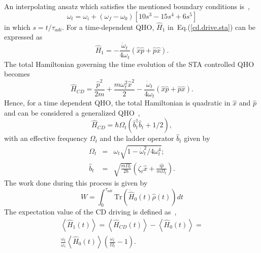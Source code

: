 \documentclass[aps,pra,twocolumn,showpacs,showkeys,groupedaddress,nobalancelastpage,nofootinbib,floatfix,superscriptaddress,longbibliography]{revtex4-2}
\begin{document}
An interpolating ansatz which satisfies the mentioned boundary conditions is~\cite{PhysRevX.4.021013},
\begin{equation}\label{freq.ansazt.sta}
   \omega_t = \omega_i + (\omega_f - \omega_0)[10s^3-15s^4+6s^5]
\end{equation}
in which $s=t/\tau_{adi}$. For a time-dependent QHO, $\hat{H}_1$ in~Eq.(\ref{cd.drive.sta}) can be expressed as~\cite{Muga_2010}
\begin{equation}\label{qho.h1.sta}
\hat{H}_1 = -\frac{\dot{\omega}_t}{4\omega_t}(\hat{x}\hat{p}+\hat{p}\hat{x}).
\end{equation}
The total Hamiltonian governing the time evolution of the STA controlled QHO becomes
\begin{equation}\label{qho.hcd.sta}
\hat{H}_{CD} = \frac{\hat{p}^2}{2m}+\frac{m\omega_t^2\hat{x}^2}{2} -\frac{\dot{\omega}_t}{4\omega_t} (\hat{x}\hat{p}+\hat{p}\hat{x}).
\end{equation}
Hence, for a time dependent QHO, the total Hamiltonian is quadratic in $\hat{x}$ and $\hat{p}$ and can be considered a generalized QHO~\cite{PhysRevE.96.012133},
\begin{equation}\label{eff.hamiltonian.cd}
\hat{H}_{CD} = \hbar \Omega_t(\hat{b}_t^{\dagger}\hat{b}_t + 1/2),
\end{equation}
with an effective frequency $\Omega_t$ and the ladder operator $\hat{b}_t$ given by
\begin{eqnarray}\label{eff.freq.lad}
  \Omega_t &=& \omega_t\sqrt{1-\dot{\omega}_t^2/4\omega_t^4}; \\
  \hat{b}_t &=& \sqrt{\frac{m\Omega_t}{2\hbar}}(\zeta_t \hat{x} + \frac{i\hat{p}}{m\Omega_t}).
\end{eqnarray}
The work done during this process is given by
\begin{equation}\label{work.adi}
W = \int_{0}^{\tau_{adi}}\text{Tr}(\dot{\hat{H}}_0(t) \hat{\rho}(t)) dt
\end{equation}
The expectation value of the CD driving is defined as~\cite{PhysRevE.98.032121},
\begin{multline}\label{exp.val.cd}
\left\langle \hat{H}_1(t) \right\rangle = \left\langle \hat{H}_{CD}(t) \right\rangle - \left\langle \hat{H}_0(t) \right\rangle=
\\ \frac{\omega_t}{\omega_i} \left\langle \hat{H}_0(t) \right\rangle \left(\frac{\omega_t}{\Omega_t}-1\right). 
\end{multline}
\end{document}
